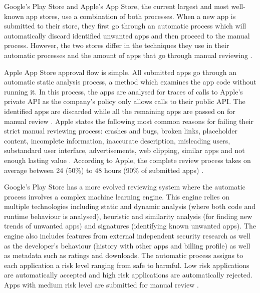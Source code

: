 Google's Play Store and Apple's App Store, the current largest and most well-known app stores, use a combination of both processes. When a new app is submitted to their store, they first go through an automatic process which will automatically discard identified unwanted apps and then proceed to the manual process. However, the two stores differ in the techniques they use in their automatic processes and the amount of apps that go through manual reviewing \cite{AppleInsiderWebsite, AndroidWhitePaper}.

Apple App Store approval flow is simple. All submitted apps go through an automatic static analysis process, a method which examines the app code without running it. In this process, the apps are analysed for traces of calls to Apple's private API as the company's policy only allows calls to their public API. The identified apps are discarded while all the remaining apps are passed on for manual review \cite{AppleInsiderWebsite, AppleApprovalFortune}. Apple states the following most common reasons for failing their strict manual reviewing process: crashes and bugs, broken links, placeholder content, incomplete information, inaccurate description, misleading users, substandard user interface, advertisements, web clipping, similar apps and not enough lasting value \cite{AppleReviewRejections}. According to Apple, the complete review process takes on average between 24 (50\%) to 48 hours (90\% of submitted apps) \cite{AppleReviewTime}. 

Google's Play Store has a more evolved reviewing system where the automatic process involves a complex machine learning engine. This engine relies on multiple technologies including static and dynamic analysis (where both code and runtime behaviour is analysed), heuristic and similarity analysis (for finding new trends of unwanted apps) and signatures (identifying known unwanted apps). The engine also includes features from external independent security research as well as the developer's behaviour (history with other apps and billing profile) as well as metadata such as ratings and downloads. The automatic process assigns to each application a risk level ranging from safe to harmful. Low risk applications are automatically accepted and high risk applications are automatically rejected. Apps with medium risk level are submitted for manual review \cite{AndroidWhitePaper}. 

\medskip

